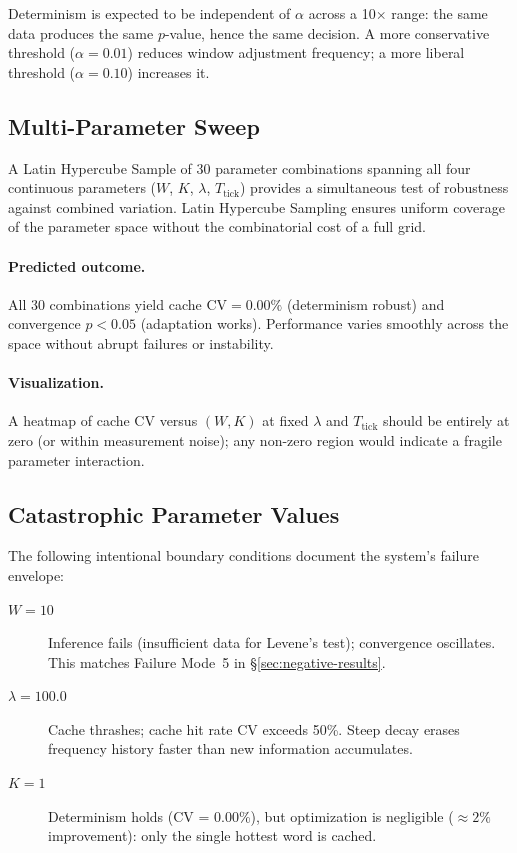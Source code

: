 Determinism is expected to be independent of $\alpha$ across a 10$\times$
range: the same data produces the same $p$-value, hence the same decision. A
more conservative threshold ($\alpha = 0.01$) reduces window adjustment
frequency; a more liberal threshold ($\alpha = 0.10$) increases it.

\subsection{Multi-Parameter Sweep}

A Latin Hypercube Sample of 30 parameter combinations spanning all four
continuous parameters ($W$, $K$, $\lambda$, $T_{\text{tick}}$) provides a
simultaneous test of robustness against combined variation. Latin Hypercube
Sampling ensures uniform coverage of the parameter space without the
combinatorial cost of a full grid.

\paragraph{Predicted outcome.}
All 30 combinations yield cache $\text{CV} = 0.00\%$ (determinism robust)
and convergence $p < 0.05$ (adaptation works). Performance varies smoothly
across the space without abrupt failures or instability.

\paragraph{Visualization.}
A heatmap of cache CV versus $(W, K)$ at fixed $\lambda$ and $T_{\text{tick}}$
should be entirely at zero (or within measurement noise); any non-zero region
would indicate a fragile parameter interaction.

\subsection{Catastrophic Parameter Values}

The following intentional boundary conditions document the system's failure
envelope:

\begin{description}
  \item[$W = 10$] Inference fails (insufficient data for Levene's test);
    convergence oscillates. This matches Failure Mode~5 in
    \S\ref{sec:negative-results}.

  \item[$\lambda = 100.0$] Cache thrashes; cache hit rate CV exceeds 50\%.
    Steep decay erases frequency history faster than new information
    accumulates.

  \item[$K = 1$] Determinism holds (CV = 0.00\%), but optimization is
    negligible ($\approx 2\%$ improvement): only the single hottest word is
    cached.
\end{description}

